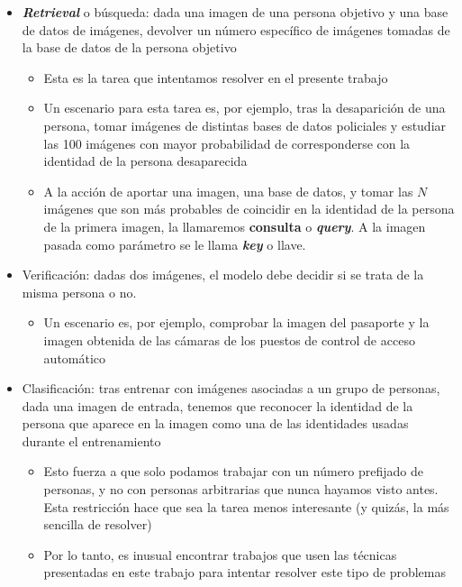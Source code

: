 \begin{itemize}
	\item \textbf{\textit{Retrieval}} o búsqueda: dada una imagen de una persona objetivo y una base de datos de imágenes, devolver un número específico de imágenes tomadas de la base de datos de la persona objetivo

	      \begin{itemize}
		      \item Esta es la tarea que intentamos resolver en el presente trabajo
		      \item Un escenario para esta tarea es, por ejemplo, tras la desaparición de una persona, tomar imágenes de distintas bases de datos policiales y estudiar las 100 imágenes con mayor probabilidad de corresponderse con la identidad de la persona desaparecida
		      \item A la acción de aportar una imagen, una base de datos, y tomar las $N$ imágenes que son más probables de coincidir en la identidad de la persona de la primera imagen, la llamaremos \textbf{consulta} o \textbf{\textit{query}}. A la imagen pasada como parámetro se le llama \textbf{\textit{key}} o llave.
	      \end{itemize}

	\item Verificación: dadas dos imágenes, el modelo debe decidir si se trata de la misma persona o no.
	      \begin{itemize}
		      \item Un escenario es, por ejemplo, comprobar la imagen del pasaporte y la imagen obtenida de las cámaras de los puestos de control de acceso automático \cite{informatica:docface}
	      \end{itemize}

	\item Clasificación: tras entrenar con imágenes asociadas a un grupo de personas, dada una imagen de entrada, tenemos que reconocer la identidad de la persona que aparece en la imagen como una de las identidades usadas durante el entrenamiento
	      \begin{itemize}
		      \item Esto fuerza a que solo podamos trabajar con un número prefijado de personas, y no con personas arbitrarias que nunca hayamos visto antes. Esta restricción hace que sea la tarea menos interesante (y quizás, la más sencilla de resolver)
		      \item Por lo tanto, es inusual encontrar trabajos que usen las técnicas presentadas en este trabajo para intentar resolver este tipo de problemas
	      \end{itemize}

\end{itemize}

